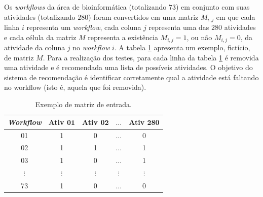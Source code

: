 Os \emph{workflows} da área de bioinformática (totalizando \(73\)) em conjunto com suas atividades (totalizando \(280\)) foram convertidos em uma matriz \(M_{i,j}\) em que cada linha \(i\) representa um \emph{workflow}, cada coluna \(j\) representa uma das \(280\) atividades e cada célula da matriz \(M\) representa a existência \(M_{i,j} = 1\), ou não \(M_{i,j} = 0\), da atividade da coluna \(j\) no \emph{workflow} \(i\). A tabela \ref{tabela_matriz_de_dados} apresenta um exemplo, fictício, de matriz \(M\). Para a realização dos testes, para cada linha da tabela \ref{tabela_matriz_de_dados} é removida uma atividade e é recomendada uma lista de possíveis atividades. O objetivo do sistema de recomendação é identificar corretamente qual a atividade está faltando no workflow (isto é, aquela que foi removida). 
\begin{table}[htb]
	\centering
	\caption{Exemplo de matriz de entrada.}
		\begin{tabular}{|c|c|c|c|c|}  \hline
		\textbf{\emph{Workflow}} & \textbf{Ativ \(\mathbf{01}\)} & \textbf{Ativ \(\mathbf{02}\)} & \textbf{\(\mathbf{\ldots}\)} & \textbf{Ativ \(\mathbf{280}\)}  \\ \hline
		01 			  & 1 			  & 0 			  & \(\ldots\) 	  & 0  				\\ \hline
		02 			  & 1 			  & 1 			  & \(\ldots\) 	  & 1  				\\ \hline
		03 			  & 1 			  & 0 			  & \(\ldots\) 	  & 1  				\\ \hline
		\(\vdots\) 		  			  & \(\vdots\) 	  & \(\vdots\) 	  & \(\vdots\) 	  & \(\vdots\) 		\\ \hline
		73 			  & 1 			  & 0 			  & \(\ldots\) 	  & 0  				\\ \hline
		\end{tabular}
	\label{tabela_matriz_de_dados}
	\vspace{0.1cm}
	\source{\varAutorData}
\end{table}

